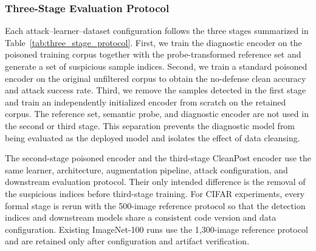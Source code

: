 \documentclass[10pt,journal]{IEEEtran}
\begin{document}
\subsubsection{Three-Stage Evaluation Protocol}
Each attack--learner--dataset configuration follows the three stages
summarized in Table~\ref{tab:three_stage_protocol}. First, we train the
diagnostic encoder on the poisoned training corpus together with the
probe-transformed reference set and generate a set of suspicious sample
indices. Second, we train a standard poisoned encoder on the original
unfiltered corpus to obtain the no-defense clean accuracy and attack
success rate. Third, we remove the samples detected in the first stage and
train an independently initialized encoder from scratch on the retained
corpus. The reference set, semantic probe, and diagnostic encoder are not
used in the second or third stage. This separation prevents the diagnostic
model from being evaluated as the deployed model and isolates the effect
of data cleansing.

\begin{table}[!t]
    \centering
    \caption{Three-stage training protocol. The reference set is used only
    in diagnostic training.}
    \label{tab:three_stage_protocol}
\end{table}

The second-stage poisoned encoder and the third-stage CleanPost encoder
use the same learner, architecture, augmentation pipeline, attack
configuration, and downstream evaluation protocol. Their only intended
difference is the removal of the suspicious indices before third-stage
training. For CIFAR experiments, every formal stage is rerun with the
500-image reference protocol so that the detection indices and downstream
models share a consistent code version and data configuration. Existing
ImageNet-100 runs use the 1,300-image reference protocol and are retained
only after configuration and artifact verification.
\end{document}
